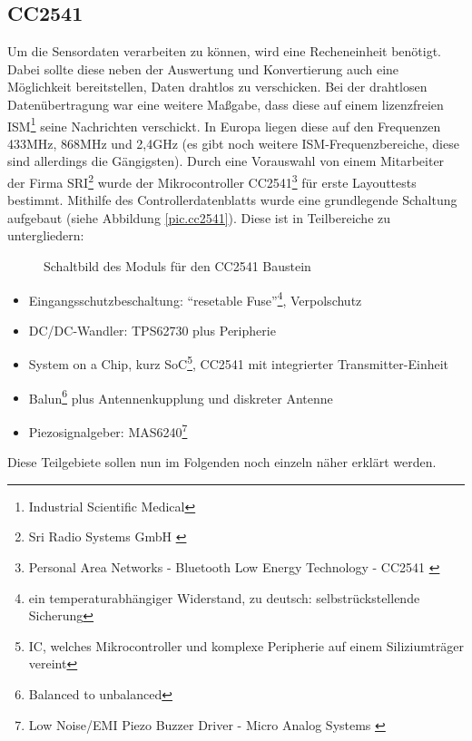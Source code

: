 \documentclass[12pt]{scrreprt} %
\begin{document}
\subsection{CC2541}
\label{CC2541}
Um die Sensordaten verarbeiten zu können, wird eine Recheneinheit benötigt. Dabei sollte diese neben der Auswertung und Konvertierung auch eine Möglichkeit bereitstellen, Daten drahtlos zu verschicken. Bei der drahtlosen Datenübertragung war eine weitere Maßgabe, dass diese auf einem lizenzfreien ISM\footnote{Industrial Scientific Medical} seine Nachrichten verschickt. In Europa liegen diese auf den Frequenzen 433MHz, 868MHz und 2,4GHz (es gibt noch weitere ISM-Frequenzbereiche, diese sind allerdings die Gängigsten). Durch eine Vorauswahl von einem Mitarbeiter der Firma SRI\footnote{Sri Radio Systems GmbH \citep{SRI}} wurde der Mikrocontroller CC2541\footnote{Personal Area Networks - Bluetooth Low Energy Technology - CC2541 \citep{TICC2541}} für erste Layouttests bestimmt. Mithilfe des Controllerdatenblatts \citep{CC2541} wurde eine grundlegende Schaltung aufgebaut (siehe Abbildung \vref{pic.cc2541}). Diese ist in Teilbereiche zu untergliedern:
\begin{figure}
\centering
{}
\caption[Schaltbild des Moduls, CC2541]{Schaltbild des Moduls für den CC2541 Baustein}
\label{pic.cc2541}
\end{figure}
\begin{itemize}
\item
Eingangsschutzbeschaltung:  "`resetable Fuse"'\footnote{ein temperaturabhängiger Widerstand, zu deutsch: selbstrückstellende Sicherung}, Verpolschutz
\item
DC/DC-Wandler: TPS62730 plus Peripherie
\item
System on a Chip, kurz SoC\footnote{IC, welches Mikrocontroller und komplexe Peripherie auf einem Siliziumträger vereint}, CC2541 mit integrierter Transmitter-Einheit
\item
Balun\footnote{Balanced to unbalanced} plus Antennenkupplung und diskreter Antenne
\item
Piezosignalgeber: MAS6240\footnote{Low Noise/EMI Piezo Buzzer Driver - Micro Analog Systems \citep{MAS}} 
\end{itemize}
Diese Teilgebiete sollen nun im Folgenden noch einzeln näher erklärt werden.
\end{document}
